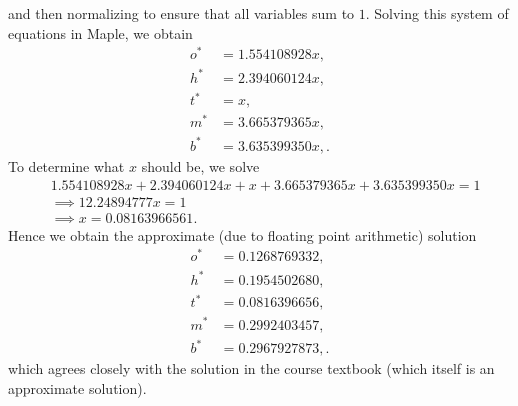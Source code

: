 \documentclass{article}
\begin{document}
and then normalizing to ensure that all variables sum to $1$. Solving
this system of equations in Maple, we obtain
%
\begin{align*}
    o^* &= 1.554108928 x, \\
    h^* &= 2.394060124 x, \\
    t^* &= x, \\
    m^* &= 3.665379365 x, \\
    b^* &= 3.635399350 x,
    .
\end{align*}
%
To determine what $x$ should be, we solve
%
\begin{align*}
    &1.554108928 x + 2.394060124 x + x + 3.665379365 x + 3.635399350 x = 1 \\
    &\implies 12.24894777 x = 1 \\
    &\implies x = 0.08163966561
    .
\end{align*}
%
Hence we obtain the approximate (due to floating point arithmetic)
solution
%
\begin{align*}
    o^* &= 0.1268769332, \\
    h^* &= 0.1954502680, \\
    t^* &= 0.0816396656, \\
    m^* &= 0.2992403457, \\
    b^* &= 0.2967927873,
    .
\end{align*}
%
which agrees closely with the solution in the course textbook (which
itself is an approximate solution).
\end{document}
